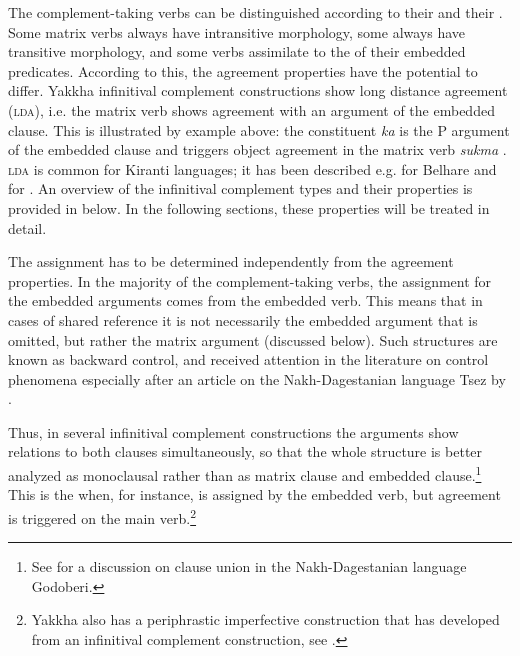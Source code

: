 The complement-taking verbs can be distinguished according to their  and their . Some matrix verbs always have intransitive morphology, some always have transitive morphology, and some verbs assimilate to the  of their embedded predicates.   According  to this, the agreement properties have the potential to differ. Yakkha infinitival complement constructions show long distance agreement (\textsc{lda}), i.e. the matrix verb shows agreement with an argument of the embedded clause. This is illustrated  by example \LLast[b] above: the constituent \emph{ka}  is the P argument of the embedded clause and triggers object agreement in the matrix verb \emph{sukma} . \textsc{lda} is common for Kiranti languages; it has been described  e.g. for Belhare \citep{Bickeletal2001Syntactic, Bickel2004Hidden} and for  \citep{Schackow2008Clause}. An overview of the infinitival complement types and their properties is provided in  below. In the following sections, these properties will be treated in detail.
 
The  assignment has to be determined independently from the agreement properties. In the majority of the complement-taking verbs, the  assignment for the embedded arguments comes from the embedded verb. This means that in cases of shared reference it is not necessarily the embedded argument that is omitted, but rather the matrix argument (discussed below). Such structures are known as backward control, and received attention in the literature on control phenomena especially after an article on the Nakh-Dagestanian language Tsez by \citet{Polinskyetal2002_Backward}. 

Thus, in several infinitival complement constructions the arguments show relations to both clauses simultaneously, so that the whole structure is better analyzed as monoclausal rather than as matrix clause and embedded clause.\footnote{See \citet{Haspelmath1999Long-distance} for a discussion on clause union in the Nakh-Dagestanian language Godoberi.}  This is the  when, for instance,   is assigned by the embedded verb, but agreement is triggered on the  main verb.\footnote{Yakkha also has a periphrastic imperfective construction that  has developed from an infinitival complement construction, see .}  


